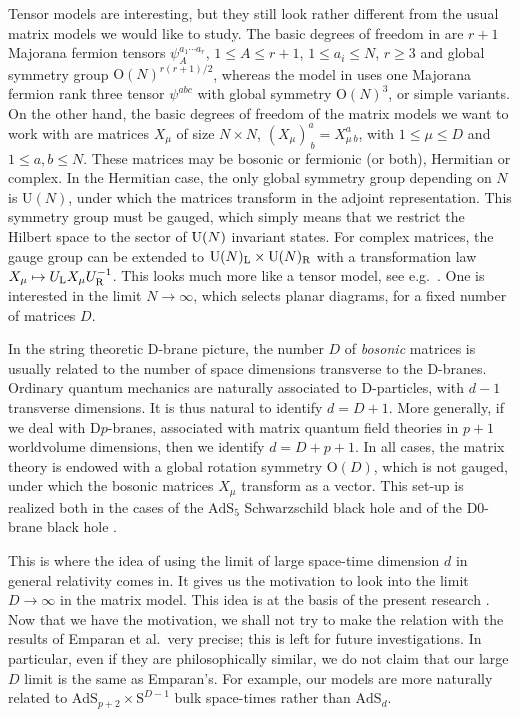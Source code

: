 \documentclass[12pt]{article}
\numberwithin{equation}{section}
\begin{document}
Tensor models are interesting, but they still look rather different from the usual matrix models we would like to study. The basic degrees of freedom in \cite{witten} are $r+1$ Majorana fermion tensors $\psi^{a_{1}\cdots a_{r}}_{A}$, $1\leq A\leq r+1$, $1\leq a_{i}\leq N$, $r\geq 3$ and global symmetry group $\text{O}(N)^{r(r+1)/2}$, whereas the model in \cite{klebanov} uses one Majorana fermion rank three tensor $\psi^{abc}$ with global symmetry $\text{O}(N)^{3}$, or simple variants. On the other hand, the basic degrees of freedom of the matrix models we want to work with are matrices $X_{\mu}$ of size $N\times N$, $(X_{\mu})^{a}_{\ b}=X^{a}_{\mu\, b}$, with $1\leq \mu\leq D$ and $1\leq a,b\leq N$. These matrices may be bosonic or fermionic (or both), Hermitian or complex. In the Hermitian case, the only global symmetry group depending on $N$ is $\text{U}(N)$, under which the matrices transform in the adjoint representation. This symmetry group must be gauged, which simply means that we restrict the Hilbert space to the sector of $\text U(N)$ invariant states. For complex matrices, the gauge group can be extended to $\text{U}(N)_{\text L}\times\text{U}(N)_{\text R}$ with a transformation law $X_{\mu}\mapsto U_{\text L}X_{\mu}U_{\text R}^{-1}$. This looks much more like a tensor model, see e.g.\ \cite{Bonzom}. One is interested in the limit $N\rightarrow\infty$, which selects planar diagrams, for a fixed number of matrices $D$.

In the string theoretic D-brane picture, the number $D$ of \emph{bosonic} matrices is usually related to the number of space dimensions transverse to the D-branes. Ordinary quantum mechanics are naturally associated to D-particles, with $d-1$ transverse dimensions. It is thus natural to identify $d=D+1$. More generally, if we deal with D$p$-branes, associated with matrix quantum field theories in $p+1$ worldvolume dimensions, then we identify $d=D+p+1$. In all cases, the matrix theory is endowed with a global rotation symmetry $\text{O}(D)$, which is not gauged, under which the bosonic matrices $X_{\mu}$ transform as a vector. This set-up is realized both in the cases of the $\text{AdS}_{5}$ Schwarzschild black hole \cite{WittenBHAdS} and of the D0-brane black hole \cite{D0BH}.

This is where the idea \cite{Emparan} of using the limit of large space-time dimension $d$ in general relativity comes in. It gives us the motivation to look into the limit $D\rightarrow\infty$ in the matrix model. This idea is at the basis of the present research \cite{project}. Now that we have the motivation, we shall not try to make the relation with the results of Emparan et al.\ very precise; this is left for future investigations. In particular, even if they are philosophically similar, we do not claim that our large $D$ limit is the same as Emparan's. For example, our models are more naturally related to $\text{AdS}_{p+2}\times\text{S}^{D-1}$ bulk space-times rather than $\text{AdS}_{d}$.
\end{document}
